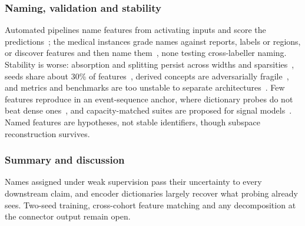 \subsubsection{Naming, validation and stability}

Automated pipelines name features from activating inputs and score the
predictions~\cite{paulo2024automatically}; the medical instances grade names against reports, labels or
regions, or discover features and then name
them~\cite{bouzid2025insights,abdulaal2024an,haque2026medconcept,nakka2025mammosae,rao2024discover}, none
testing cross-labeller naming. Stability is worse: absorption and splitting persist across widths and
sparsities~\cite{chanin2024a}, seeds share about 30\% of features~\cite{paulo2025sparse}, derived
concepts are adversarially fragile~\cite{li2025evaluating}, and metrics and benchmarks are too unstable to
separate architectures~\cite{chanin2026are,chanin2026synthsaebench}. Few features reproduce in an
event-sequence anchor, where dictionary probes do not beat dense ones~\cite{sainsbury2026sparse}, and
capacity-matched suites are proposed for signal models~\cite{duan2026ecginterpbench}. Named features are
hypotheses, not stable identifiers, though subspace reconstruction survives.


\subsubsection{Summary and discussion}

Names assigned under weak supervision pass their uncertainty to every downstream claim, and encoder
dictionaries largely recover what probing already sees. Two-seed training, cross-cohort feature matching and
any decomposition at the connector output remain open.
